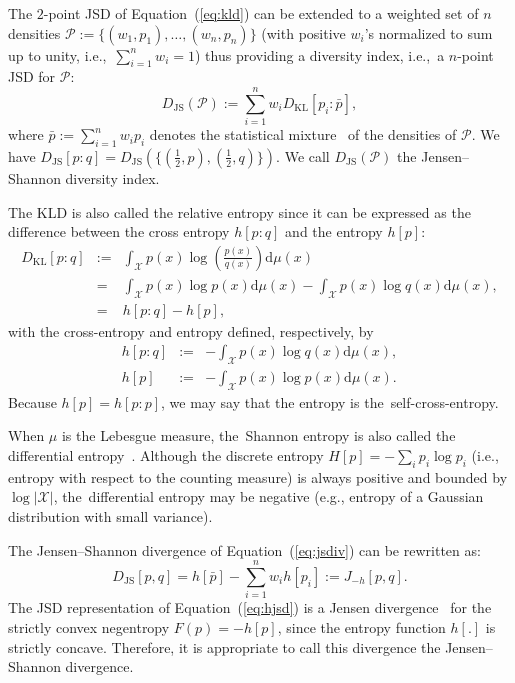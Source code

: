 \documentclass[entropy,article,accept,oneauthor,pdftex,entropy]{Definitions/mdpi}
\def\JS{\mathrm{JS}}
\def\KL{\mathrm{KL}}
\def\dmu{\mathrm{d}\mu}
\def\calP{\mathcal{P}}
\def\calX{\mathcal{X}}
\def\dmu{\mathrm{d}\mu}
\begin{document}
The  $2$-point JSD  of Equation~(\ref{eq:kld}) can be extended to a weighted set of $n$ densities 
$\calP:=\{(w_1,p_1), \ldots, (w_n,p_n)\}$ (with positive $w_i$'s normalized to sum up to unity, i.e.,~$\sum_{i=1}^n w_i=1$) thus providing a diversity index, i.e.,~a $n$-point JSD for $\calP$:
\begin{equation}\label{eq:jsdiv}
D_\JS(\calP) :=   \sum_{i=1}^n w_i D_\KL\left[p_i:\bar{p}\right],
\end{equation}
where $\bar{p}:=\sum_{i=1}^n w_ip_i$ denotes the statistical mixture~\cite{Mixtures-2004} of the densities of $\calP$.
We have $D_\JS[p:q]=D_\JS(\{(\frac{1}{2},p),(\frac{1}{2},q)\})$. We call $D_\JS(\calP)$ the Jensen--Shannon diversity index.

The KLD is also called the relative entropy since it can be expressed as  the difference between the cross entropy $h[p:q]$ and the entropy $h[p]$:
\begin{eqnarray}
D_\KL[p:q] &:=& \int_\calX p(x)\log\left(\frac{p(x)}{q(x)}\right)\dmu(x) \\
&=& \int_\calX p(x)\log {p(x)} \dmu(x) - \int_\calX p(x)\log {q(x)} \dmu(x),\\
&=&  h[p:q]-h[p],
\end{eqnarray}
 with the cross-entropy and entropy defined, respectively, by 
\vspace{12pt}
\begin{eqnarray}
h[p:q]&:=&-\int_\calX p(x)\log q(x)\dmu(x),\\
h[p]&:=&-\int_\calX p(x)\log p(x)\dmu(x).
\end{eqnarray} 
Because $h[p]=h[p:p]$, we may say that the entropy is the~self-cross-entropy. 


When $\mu$ is the Lebesgue measure, the~Shannon entropy is also called the differential entropy~\cite{CoverThomasIT-2012}.
Although the discrete entropy $H[p]=-\sum_i p_i\log p_i$ (i.e., entropy with respect to the counting measure) is always positive and bounded by $\log|\calX|$, the~differential entropy may be negative (e.g., entropy of a Gaussian distribution with small variance).

The Jensen--Shannon divergence of Equation~(\ref{eq:jsdiv}) can be rewritten as:
\begin{equation}\label{eq:hjsd}
D_\JS[p,q] =  h[\bar{p}] - \sum_{i=1}^n w_i h[p_i] :=J_{-h}[p,q].
\end{equation}
The JSD representation of Equation~(\ref{eq:hjsd}) is a Jensen divergence~\cite{BR-2011} for the strictly convex negentropy $F(p)=-h[p]$, since the entropy function $h[.]$ is strictly concave.
Therefore, it is appropriate to call this divergence the Jensen--Shannon divergence.
\end{document}
